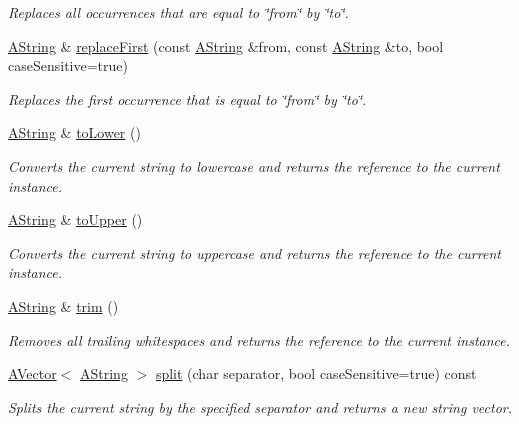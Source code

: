 \begin{DoxyCompactItemize}
\begin{DoxyCompactList}\small\item\em Replaces all occurrences that are equal to \char`\"{}from\char`\"{} by \char`\"{}to\char`\"{}. \end{DoxyCompactList}\item 
\mbox{\hyperlink{class_a_string}{A\+String}} \& \mbox{\hyperlink{class_a_string_af28290e59b97962a365e89e475376ac7}{replace\+First}} (const \mbox{\hyperlink{class_a_string}{A\+String}} \&from, const \mbox{\hyperlink{class_a_string}{A\+String}} \&to, bool case\+Sensitive=true)
\begin{DoxyCompactList}\small\item\em Replaces the first occurrence that is equal to \char`\"{}from\char`\"{} by \char`\"{}to\char`\"{}. \end{DoxyCompactList}\item 
\mbox{\hyperlink{class_a_string}{A\+String}} \& \mbox{\hyperlink{class_a_string_aade3f9bf7dfe337df49f7f094068379e}{to\+Lower}} ()
\begin{DoxyCompactList}\small\item\em Converts the current string to lowercase and returns the reference to the current instance. \end{DoxyCompactList}\item 
\mbox{\hyperlink{class_a_string}{A\+String}} \& \mbox{\hyperlink{class_a_string_af4def080314da5a03fcead8b7cf822bc}{to\+Upper}} ()
\begin{DoxyCompactList}\small\item\em Converts the current string to uppercase and returns the reference to the current instance. \end{DoxyCompactList}\item 
\mbox{\hyperlink{class_a_string}{A\+String}} \& \mbox{\hyperlink{class_a_string_a2ba7d2ba7eb61998453f7e7ce364d441}{trim}} ()
\begin{DoxyCompactList}\small\item\em Removes all trailing whitespaces and returns the reference to the current instance. \end{DoxyCompactList}\item 
\mbox{\hyperlink{class_a_vector}{A\+Vector}}$<$ \mbox{\hyperlink{class_a_string}{A\+String}} $>$ \mbox{\hyperlink{class_a_string_a6379fc6d17388a71589b983ba651bf8c}{split}} (char separator, bool case\+Sensitive=true) const
\begin{DoxyCompactList}\small\item\em Splits the current string by the specified separator and returns a new string vector. \end{DoxyCompactList}\item 

\end{DoxyCompactItemize}
